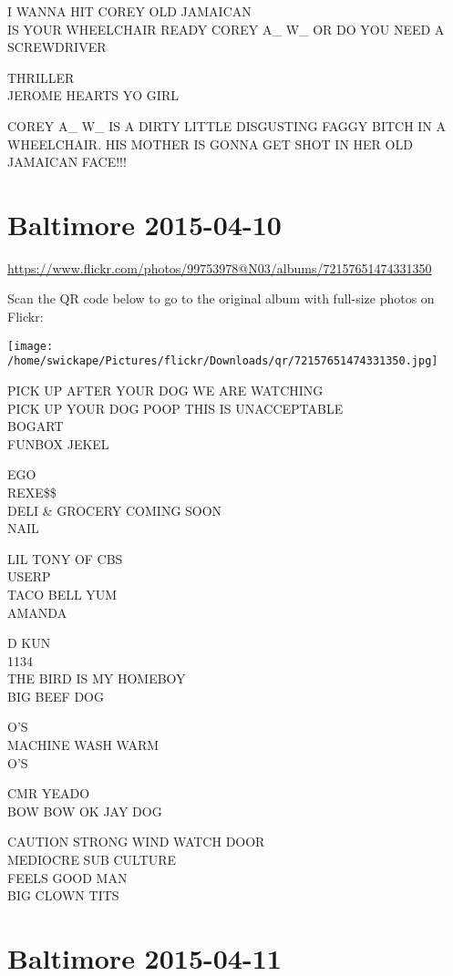 \documentclass[10pt,letterpaper]{article}
\begin{document}
I WANNA HIT COREY OLD JAMAICAN\\
IS YOUR WHEELCHAIR READY COREY A\_ W\_ OR DO YOU NEED A SCREWDRIVER

THRILLER\\
JEROME HEARTS YO GIRL

COREY A\_ W\_ IS A DIRTY LITTLE DISGUSTING FAGGY BITCH IN A WHEELCHAIR.  HIS MOTHER IS GONNA GET SHOT IN HER OLD JAMAICAN FACE!!!
\pagebreak

\section*{Baltimore 2015-04-10}

\url{https://www.flickr.com/photos/99753978@N03/albums/72157651474331350}

Scan the QR code below to go to the original album with full-size photos on Flickr:

\texttt{[image: /home/swickape/Pictures/flickr/Downloads/qr/72157651474331350.jpg]}
\pagebreak

PICK UP AFTER YOUR DOG WE ARE WATCHING\\
PICK UP YOUR DOG POOP THIS IS UNACCEPTABLE\\
BOGART\\
FUNBOX JEKEL

EGO\\
REXE\$\$\\
DELI \& GROCERY COMING SOON\\
NAIL

LIL TONY OF CBS\\
USERP\\
TACO BELL YUM\\
AMANDA

D KUN\\
1134\\
THE BIRD IS MY HOMEBOY\\
BIG BEEF DOG

O'S\\
MACHINE WASH WARM\\
O'S

CMR YEADO\\
BOW BOW OK JAY DOG

CAUTION STRONG WIND WATCH DOOR\\
MEDIOCRE SUB CULTURE\\
FEELS GOOD MAN\\
BIG CLOWN TITS
\pagebreak

\section*{Baltimore 2015-04-11}
\end{document}
